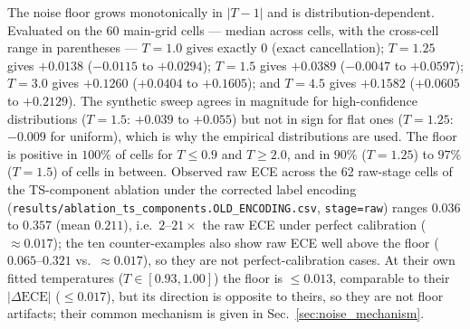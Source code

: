 \documentclass[review,12pt,nonatbib]{elsarticle}
\begin{document}
The noise floor grows monotonically in $|T-1|$ and is
distribution-dependent. Evaluated on the 60 main-grid cells --- median
across cells, with the cross-cell range in parentheses --- $T=1.0$ gives
exactly $0$ (exact cancellation); $T=1.25$ gives $+0.0138$
($-0.0115$ to $+0.0294$); $T=1.5$ gives $+0.0389$ ($-0.0047$ to
$+0.0597$); $T=3.0$ gives $+0.1260$ ($+0.0404$ to $+0.1605$); and
$T=4.5$ gives $+0.1582$ ($+0.0605$ to $+0.2129$). The synthetic sweep
agrees in magnitude for high-confidence distributions ($T=1.5$:
$+0.039$ to $+0.055$) but not in sign for flat ones ($T=1.25$:
$-0.009$ for uniform), which is why the empirical distributions are used.
The floor is positive in $100\%$ of cells for $T \leq 0.9$ and
$T \geq 2.0$, and in $90\%$ ($T=1.25$) to $97\%$ ($T=1.5$) of cells in
between. Observed raw ECE across the 62 raw-stage cells of the
TS-component ablation under the corrected label encoding
(\texttt{results/ablation\_ts\_components.OLD\_ENCODING.csv},
\texttt{stage=raw}) ranges $0.036$ to $0.357$ (mean $0.211$), i.e.\
$2$--$21\times$ the raw ECE
under perfect calibration ($\approx 0.017$); the ten counter-examples
also show raw ECE well above the floor ($0.065$--$0.321$ vs.\
$\approx 0.017$), so they are not perfect-calibration cases. At their own
fitted temperatures ($T \in [0.93, 1.00]$) the floor is $\leq 0.013$,
comparable to their $|\Delta\text{ECE}|$ ($\leq 0.017$), but its
direction is opposite to theirs, so they are not floor artifacts; their
common mechanism is given in Sec.~\ref{sec:noise_mechanism}.
\end{document}
